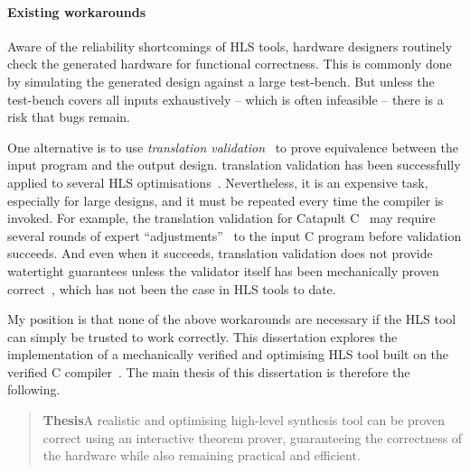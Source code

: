 \paragraph{Existing workarounds}

Aware of the reliability shortcomings of \gls{HLS} tools, hardware designers
routinely check the generated hardware for functional correctness.  This is
commonly done by simulating the generated design against a large test-bench.
But unless the test-bench covers all inputs exhaustively -- which is often
infeasible -- there is a risk that bugs remain.

One alternative is to use \emph{\gls{translation
    validation}}~\cite{pnueli98_trans} to prove equivalence between the input
program and the output design. \Gls{translation validation} has been
successfully applied to several \gls{HLS} optimisations~\cite{kim04_autom_fsmd,
  karfa06_formal_verif_method_sched_high_synth,
  chouksey20_verif_sched_condit_behav_high_level_synth,
  banerjee14_verif_code_motion_techn_using_value_propag,
  chouksey19_trans_valid_code_motion_trans_invol_loops}.  Nevertheless, it is an
expensive task, especially for large designs, and it must be repeated every time
the compiler is invoked.  For example, the translation validation for Catapult
C~\cite{mentor20_catap_high_level_synth} may require several rounds of expert
\enquote{adjustments}~\cite[p.~3]{chauhan20_formal_ensur_equiv_c_rtl} to the
input C program before validation succeeds. And even when it succeeds,
translation validation does not provide watertight guarantees unless the
validator itself has been mechanically proven
correct~\cite[e.g.][]{tristan08_formal_verif_trans_valid}, which has not been
the case in \gls{HLS} tools to date.

My position is that none of the above workarounds are necessary if the \gls{HLS}
tool can simply be trusted to work correctly.  This dissertation explores the
implementation of a mechanically verified and optimising \gls{HLS} tool built on
the \compcert{} verified C compiler~\cite{leroy06_formal_certif_compil_back_end,
  leroy09_formal_verif_realis_compil, leroy16_cfvoc}.  The main thesis of this
dissertation is therefore the following.

\begin{samepage}
  \begin{quote}
    \textbf{Thesis}\quad A realistic and optimising high-level synthesis tool
    can be proven correct using an interactive theorem prover, guaranteeing the
    correctness of the hardware while also remaining practical and efficient.
  \end{quote}
\end{samepage}

